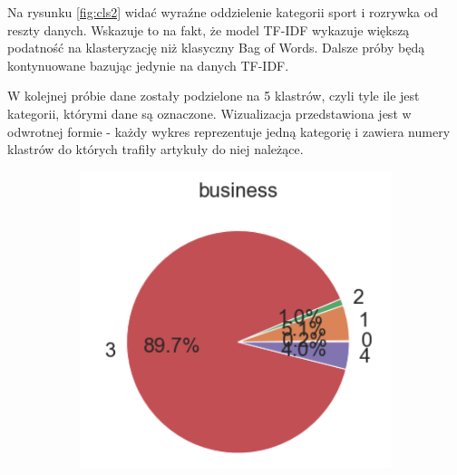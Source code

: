 Na rysunku \ref{fig:cls2} widać wyraźne oddzielenie kategorii sport i rozrywka od reszty danych. Wskazuje to na fakt, że model TF-IDF wykazuje większą podatność na klasteryzację niż klasyczny Bag of Words. Dalsze próby będą kontynuowane bazując jedynie na danych TF-IDF.

W kolejnej próbie dane zostały podzielone na 5 klastrów, czyli tyle ile jest kategorii, którymi dane są oznaczone. Wizualizacja przedstawiona jest w odwrotnej formie - każdy wykres reprezentuje jedną kategorię i zawiera numery klastrów do których trafiły artykuły do niej należące.

\begin{figure}[H]
     \centering
     \begin{subfigure}[b]{0.38\textwidth}
         \centering
         \includegraphics[width=\textwidth]{images/analiza/c_b.png}
     \end{subfigure}
     \hfill
     \begin{subfigure}[b]{0.34\textwidth}
         \centering

\end{subfigure}
\end{figure}
